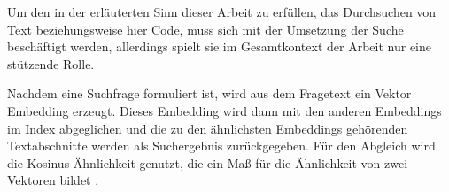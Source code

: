 \documentclass[../main.tex]{subfiles}
\begin{document}
Um den in der  erläuterten Sinn dieser Arbeit zu erfüllen, das Durchsuchen von Text beziehungsweise hier Code, muss sich mit der Umsetzung der Suche beschäftigt werden, allerdings spielt sie im Gesamtkontext der Arbeit nur eine stützende Rolle.

Nachdem eine Suchfrage formuliert ist, wird aus dem Fragetext ein Vektor Embedding erzeugt.
Dieses Embedding wird dann mit den anderen Embeddings im Index abgeglichen und die zu den ähnlichsten Embeddings gehörenden Textabschnitte werden als Suchergebnis zurückgegeben. 
Für den Abgleich wird die Kosinus-Ähnlichkeit genutzt, die ein Maß für die Ähnlichkeit von zwei Vektoren bildet \cite{rahutomo2012semantic}.
\end{document}
